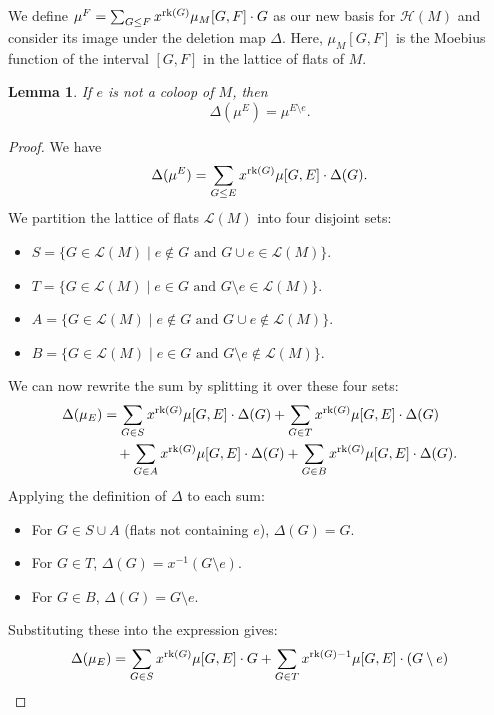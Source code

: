 \documentclass[11pt]{article}
\newcommand{\calL}{\mathcal{L}}
\newcommand{\calH}{\mathcal{H}}
\newcommand{\rank}{\normalfont\text{rk}}
\newtheorem{lemma}[theorem]{Lemma}
\theoremstyle{remark}
\begin{document}
We define $\mu^F = \sum_{G\leq F} x^{\rank(G)}\mu_{M}[G,F]\cdot G$ as our new basis for $\calH(M)$ and consider
its image under the deletion map $\Delta$. Here, $\mu_{M}[G,F]$ is the
Moebius function of the interval $[G,F]$ in the lattice of flats of $M$.

\begin{lemma}

    If $e$ is not a coloop of $M$, then
    \[
        \Delta(\mu^E) = \mu^{E\setminus e}.
    \]
\end{lemma}

\begin{proof}
    We have
    \[
        \Delta(\mu^E) = \sum_{G\leq E} x^{\rank(G)}\mu[G,E]\cdot \Delta(G).
    \]
    We partition the lattice of flats $\calL(M)$ into four disjoint sets:
    \begin{itemize}
        \item $S = \{G\in \calL(M)\mid e \notin G \text{ and } G\cup e \in \calL(M)\}$.
        \item $T = \{G\in \calL(M)\mid e \in G \text{ and } G\setminus e \in \calL(M)\}$.
        \item $A = \{G\in \calL(M)\mid e \notin G \text{ and } G\cup e \notin \calL(M)\}$.
        \item $B = \{G\in \calL(M)\mid e \in G \text{ and } G\setminus e \notin \calL(M)\}$.
    \end{itemize}
    We can now rewrite the sum by splitting it over these four sets:
    \begin{align*}
        \Delta(\mu_E) & = \sum_{G \in S} x^{\rank(G)}\mu[G,E]\cdot \Delta(G) + \sum_{G \in T} x^{\rank(G)}\mu[G,E]\cdot \Delta(G)       \\
                      & \quad+ \sum_{G \in A} x^{\rank(G)}\mu[G,E]\cdot \Delta(G) + \sum_{G \in B} x^{\rank(G)}\mu[G,E]\cdot \Delta(G).
    \end{align*}
    Applying the definition of $\Delta$ to each sum:
    \begin{itemize}
        \item For $G \in S \cup A$ (flats not containing $e$), $\Delta(G) = G$.
        \item For $G \in T$, $\Delta(G) = x^{-1}(G\setminus e)$.
        \item For $G \in B$, $\Delta(G) = G\setminus e$.
    \end{itemize}
    Substituting these into the expression gives:
    \begin{align*}
        \Delta(\mu_E) & = \sum_{G \in S} x^{\rank(G)}\mu[G,E]\cdot G + \sum_{G \in T} x^{\rank(G)-1}\mu[G,E]\cdot (G\setminus e)     \\

\end{align*}
\end{proof}
\end{document}
